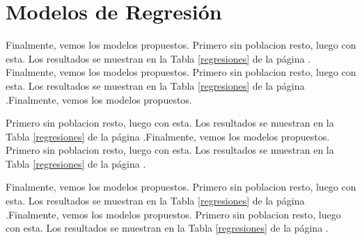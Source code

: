 \documentclass{article}
\begin{document}
\section{Modelos de Regresión}

Finalmente, vemos los modelos propuestos. Primero sin poblacion resto, luego con esta. Los resultados se muestran en la Tabla \ref{regresiones} de la página \pageref{regresiones}. Finalmente, vemos los modelos propuestos. Primero sin poblacion resto, luego con esta. Los resultados se muestran en la Tabla \ref{regresiones} de la página \pageref{regresiones}.Finalmente, vemos los modelos propuestos. 

Primero sin poblacion resto, luego con esta. Los resultados se muestran en la Tabla \ref{regresiones} de la página \pageref{regresiones}.Finalmente, vemos los modelos propuestos. Primero sin poblacion resto, luego con esta. Los resultados se muestran en la Tabla \ref{regresiones} de la página \pageref{regresiones}.

Finalmente, vemos los modelos propuestos. Primero sin poblacion resto, luego con esta. Los resultados se muestran en la Tabla \ref{regresiones} de la página \pageref{regresiones}.Finalmente, vemos los modelos propuestos. Primero sin poblacion resto, luego con esta. Los resultados se muestran en la Tabla \ref{regresiones} de la página \pageref{regresiones}.
\end{document}
